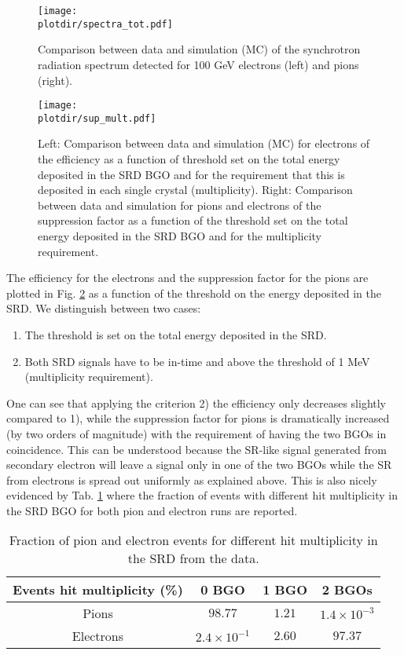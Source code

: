 \begin{figure}[htb!]
  \centering
  \texttt{[image: \\plotdir/spectra\_tot.pdf]}
  \caption{Comparison between data and simulation (MC) of the synchrotron radiation spectrum detected for 100 GeV electrons (left) and pions (right). }
  \label{fig:comp_spectra}
\end{figure} 

\begin{figure}[htb!]
  \centering
  \texttt{[image: \\plotdir/sup\_mult.pdf]}
  \caption{Left: Comparison between data and simulation (MC) for electrons of the efficiency as a function of threshold set on the total energy deposited in the SRD BGO and for the requirement that this is deposited in each single crystal (multiplicity). Right: Comparison between data and simulation for pions and electrons of the suppression factor as a function of the threshold set on the total energy deposited in the SRD BGO and for the multiplicity requirement.}
  \label{fig:sup_mult}
\end{figure}

The efficiency for the electrons and the suppression factor for the pions are plotted in Fig. \ref{fig:sup_mult} as a function of the threshold on the energy deposited in the SRD. We distinguish between two cases:
\begin{enumerate}
\item The threshold is set on the total energy deposited in the SRD.
\item Both SRD signals have to be in-time and above the threshold of 1 MeV (multiplicity requirement).
\end{enumerate}
One can see that applying the criterion 2) the efficiency only decreases slightly compared to 1), while the suppression factor for pions is dramatically increased (by two orders of magnitude) with the requirement of having the two BGOs in coincidence.
This can be understood because the SR-like signal generated from secondary electron will leave a signal only in one of the two BGOs while the SR from electrons is spread out uniformly as explained above. 
This is also nicely evidenced by Tab. \ref{tab:hits} where the fraction of events with different hit multiplicity in the SRD BGO for both pion and electron runs are reported.

\begin{table}[hbt!]
\begin{center}
\begin{tabular}{cccc}
Events hit multiplicity  (\%) & 0 BGO  & 1 BGO & 2 BGOs\\
\hline
Pions & $98.77$ & $1.21$ & $1.4\times10^{-3}$  \\
Electrons & $2.4\times10^{-1}$  & $2.60$ & $97.37$ \\
\end{tabular}
\end{center}
\caption{Fraction of pion and electron events for different hit multiplicity in the SRD from the data.}
\label{tab:hits}

\end{table}

